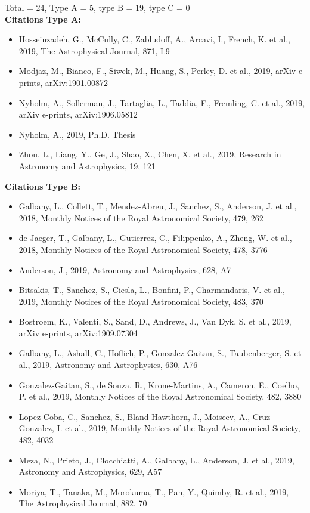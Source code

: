 \documentclass{letter}
\begin{document}
\begin{enumerate}
Total = 24, Type A = 5, type B = 19, type C = 0 \\ 
{\bf Citations Type A:}
\begin{itemize}
\item Hosseinzadeh, G., McCully, C., Zabludoff, A., Arcavi, I., French, K. et al., 2019, The Astrophysical Journal, 871, L9
\item Modjaz, M., Bianco, F., Siwek, M., Huang, S., Perley, D. et al., 2019, arXiv e-prints, arXiv:1901.00872
\item Nyholm, A., Sollerman, J., Tartaglia, L., Taddia, F., Fremling, C. et al., 2019, arXiv e-prints, arXiv:1906.05812
\item Nyholm, A., 2019, Ph.D. Thesis
\item Zhou, L., Liang, Y., Ge, J., Shao, X., Chen, X. et al., 2019, Research in Astronomy and Astrophysics, 19, 121
\end{itemize}
{\bf Citations Type B:}
\begin{itemize}
\item Galbany, L., Collett, T., Mendez-Abreu, J., Sanchez, S., Anderson, J. et al., 2018, Monthly Notices of the Royal Astronomical Society, 479, 262
\item de Jaeger, T., Galbany, L., Gutierrez, C., Filippenko, A., Zheng, W. et al., 2018, Monthly Notices of the Royal Astronomical Society, 478, 3776
\item Anderson, J., 2019, Astronomy and Astrophysics, 628, A7
\item Bitsakis, T., Sanchez, S., Ciesla, L., Bonfini, P., Charmandaris, V. et al., 2019, Monthly Notices of the Royal Astronomical Society, 483, 370
\item Bostroem, K., Valenti, S., Sand, D., Andrews, J., Van Dyk, S. et al., 2019, arXiv e-prints, arXiv:1909.07304
\item Galbany, L., Ashall, C., Hoflich, P., Gonzalez-Gaitan, S., Taubenberger, S. et al., 2019, Astronomy and Astrophysics, 630, A76
\item Gonzalez-Gaitan, S., de Souza, R., Krone-Martins, A., Cameron, E., Coelho, P. et al., 2019, Monthly Notices of the Royal Astronomical Society, 482, 3880
\item Lopez-Coba, C., Sanchez, S., Bland-Hawthorn, J., Moiseev, A., Cruz-Gonzalez, I. et al., 2019, Monthly Notices of the Royal Astronomical Society, 482, 4032
\item Meza, N., Prieto, J., Clocchiatti, A., Galbany, L., Anderson, J. et al., 2019, Astronomy and Astrophysics, 629, A57
\item Moriya, T., Tanaka, M., Morokuma, T., Pan, Y., Quimby, R. et al., 2019, The Astrophysical Journal, 882, 70

\end{itemize}
\end{enumerate}
\end{document}
